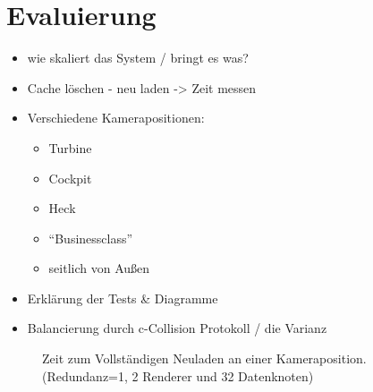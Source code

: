\chapter{Evaluierung}
\label{chap:eval}
%
\begin{itemize}
 \item wie skaliert das System / bringt es was?
 \item Cache löschen - neu laden -> Zeit messen
 \item Verschiedene Kamerapositionen:
 \begin{itemize}
  \item Turbine
  \item Cockpit
  \item Heck
  \item ``Businessclass''
  \item seitlich von Außen
 \end{itemize}
 \item Erklärung der Tests \& Diagramme
 \item Balancierung durch c-Collision Protokoll / die Varianz
\end{itemize}
%




%

%

\begin{figure}
\centering

  \caption{Zeit zum Vollständigen Neuladen an einer Kameraposition. (Redundanz=1, 2 Renderer und 32 Datenknoten)}
  \label{fig:eval:diag1}
\end{figure}

%

